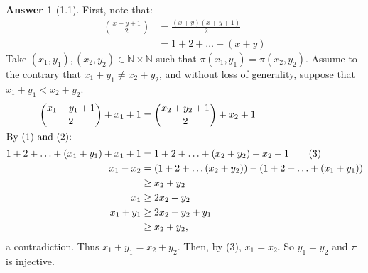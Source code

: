 \documentclass[11pt]{article}
\theoremstyle{plain}
\theoremstyle{definition}
\newtheorem*{ans}{Answer}
\newcommand{\N}{\mathbb{N}}
\begin{document}
\begin{ans}[1.1]
	First, note that:
	\begin{align}
		\binom{x + y + 1}{2} & = \frac{(x + y)(x +  y + 1)}{2} \\
		                     & = 1 + 2 + \ldots + (x + y)
	\end{align}
	Take $(x_1, y_1), (x_2, y_2) \in \N \times \N$ such that $\pi(x_1, y_1) = \pi(x_2, y_2)$.
	Assume to the contrary that $x_1 + y_1 \neq x_2 + y_2$, and without loss of generality, suppose that $x_1 + y_1 < x_2 + y_2$.
	\begin{align*}
		\binom{x_1 + y_1 + 1}{2} + x_1 + 1     & = \binom{x_2 + y_2 + 1}{2} + x_2 + 1                                    \\
		\shortintertext{By (1) and (2):}
		1 + 2 + \ldots + (x_1 + y_1) + x_1 + 1 & = 1 + 2 + \ldots + (x_2 + y_2)  + x_2 + 1                       \tag{3} \\
		x_1 - x_2                              & = (1 + 2 + \ldots (x_2 + y_2)) - (1 + 2 + \ldots + (x_1 + y_1))         \\
		                                       & \geq x_2 + y_2                                                          \\
		x_1                                    & \geq 2x_2 + y_2                                                         \\
		x_1 + y_1                              & \geq 2x_2 + y_2 + y_1                                                   \\
		                                       & \geq x_2 + y_2,
	\end{align*}
	a contradiction. Thus $x_1 + y_1 = x_2 + y_2$. Then, by (3), $x_1 = x_2$. So $y_1 = y_2$ and $\pi$ is injective.
\end{ans}
\end{document}
